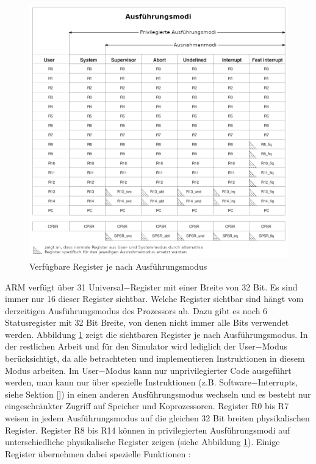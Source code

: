 \documentclass[a4paper, 11pt, onecolumn]{article}
\begin{document}
\begin{figure}[!htb]
\centering
\includegraphics[width=1\textwidth]{data/registers}
\caption{Verfügbare Register je nach Ausführungsmodus \cite{arm:2005}}
\label{fig:registers}
\end{figure}

ARM verfügt über 31 Universal$-$Register mit einer Breite von 32 Bit. Es sind immer nur 16 dieser Register sichtbar. Welche Register sichtbar sind hängt vom derzeitigen Ausführungsmodus des Prozessors ab. Dazu gibt es noch 6 Statusregister mit 32 Bit Breite, von denen nicht immer alle Bits verwendet werden. Abbildung \ref{fig:registers} zeigt die sichtbaren Register je nach Ausführungsmodus. In der restlichen Arbeit und für den Simulator wird lediglich der User$-$Modus berücksichtigt, da alle betrachteten und implementieren Instruktionen in diesem Modus arbeiten. Im User$-$Modus kann nur unprivilegierter Code ausgeführt werden, man kann nur über spezielle Instruktionen (z.B. Software$-$Interrupts, siehe Sektion []) in einen anderen Ausführungsmodus wechseln und es besteht nur eingeschränkter Zugriff auf Speicher und Koprozessoren. Register R0 bis R7 weisen in jedem Ausführungsmodus auf die gleichen 32 Bit breiten physikalischen Register. Register R8 bis R14 können in privilegierten Ausführungsmodi auf unterschiedliche physikalische Register zeigen (siehe Abbildung \ref{fig:registers}). Einige Register übernehmen dabei spezielle Funktionen \cite{arm:2005}:
\end{document}
